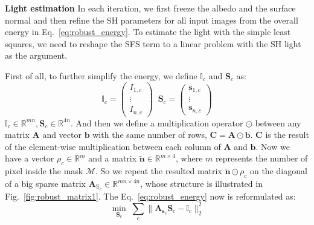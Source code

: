 \textbf{Light estimation}
In each iteration, we first freeze the albedo and the surface normal and then refine the SH parameters for all input images from the overall energy in Eq.~\ref{eq:robust_energy}.
To estimate the light with the simple least squares, we need to reshape the SFS term to a linear problem with the SH light as the argument. 

First of all, to further simplify the energy, we define $\mathbb{I}_c$ and $\mathbf{S}_c$ as:
\begin{equation}\label{eq:robust_energy_prepare}
\mathbb{I}_c = \begin{pmatrix} I_{1,c} \\ \vdots \\ I_{n,c} \end{pmatrix}  \; \; \mathbf{S}_c = \begin{pmatrix} \mathbf{s}_{1,c} \\ \vdots \\ \mathbf{s}_{n,c} \end{pmatrix}
\end{equation}
$\mathbb{I}_c \in \mathbb{R}^{mn}, \mathbf{S}_c \in \mathbb{R}^{4n}$.
And then we define a multiplication operator $\odot$ between any matrix $\mathbf{A}$ and vector $\mathbf{b}$ with the same number of rows, $\mathbf{C = A \odot b}$.
$\mathbf{C}$ is the result of the element-wise multiplication between each column of $\mathbf{A}$ and $\mathbf{b}$.
Now we have a vector $\rho_c\in \mathbb{R}^m$ and a matrix $\tilde{\mathbf{n}} \in \mathbb{R}^{m \times 4}$, where $m$ represents the number of pixel inside the mask $\mathcal{M}$.
So we repeat the resulted matrix $\tilde{\mathbf{n}} \odot \rho_c$ on the diagonal of a big sparse matrix $\mathbf{A}_{\mathbb{S}_c} \in \mathbb{R}^{mn \times 4n}$, whose structure is illustrated in Fig.~\ref{fig:robust_matrix1}.
The Eq.~\ref{eq:robust_energy} now is reformulated as:
\begin{equation}\label{eq:robust_light_estimate2}
    \min_{\mathbf{S}_c} \; \sum_{c} \lVert \mathbf{A}_{\mathbf{s}_c}\mathbf{S}_c  - \mathbb{I}_c \rVert_2^2
\end{equation}

